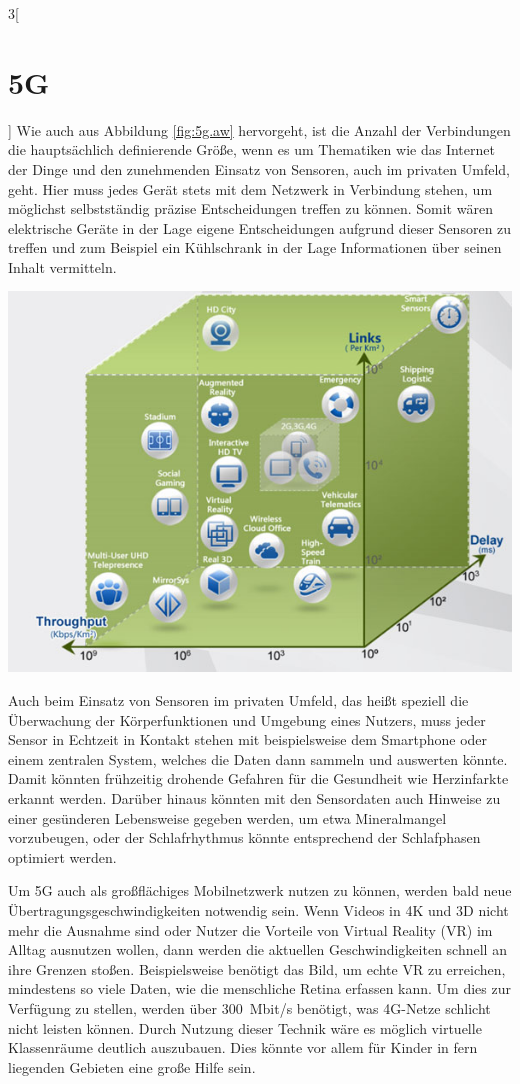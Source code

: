 \begin{multicols}{3}[\section{5G}]
Wie auch aus Abbildung \ref{fig:5g.aw} hervorgeht, ist die Anzahl der Verbindungen die hauptsächlich definierende Größe, wenn es um Thematiken wie das Internet der Dinge und den zunehmenden Einsatz von Sensoren, auch im privaten Umfeld, geht.
Hier muss jedes Gerät stets mit dem Netzwerk in Verbindung stehen, um möglichst selbstständig präzise Entscheidungen treffen zu können. Somit wären elektrische Geräte in der Lage eigene Entscheidungen aufgrund dieser Sensoren zu treffen und zum Beispiel ein Kühlschrank in der Lage Informationen über seinen Inhalt vermitteln.

\begin{Figure}
\includegraphics[width=\linewidth]{Kapitel/5G/Grafiken/5g-anwendung}
\label{fig:5g.aw}
\end{Figure}

Auch beim Einsatz von Sensoren im privaten Umfeld, das heißt speziell die Überwachung der Körperfunktionen und Umgebung eines Nutzers, muss jeder Sensor in Echtzeit in Kontakt stehen mit beispielsweise dem Smartphone oder einem zentralen System, welches die Daten dann sammeln und auswerten könnte. Damit könnten frühzeitig drohende Gefahren für die Gesundheit wie Herzinfarkte erkannt werden. Darüber hinaus könnten mit den Sensordaten auch Hinweise zu einer gesünderen Lebensweise gegeben werden, um etwa Mineralmangel vorzubeugen, oder der Schlafrhythmus könnte entsprechend der Schlafphasen optimiert werden.

Um 5G auch als großflächiges Mobilnetzwerk nutzen zu können, werden bald neue Übertragungsgeschwindigkeiten notwendig sein. Wenn Videos in 4K und 3D nicht mehr die Ausnahme sind oder Nutzer die Vorteile von Virtual Reality (VR) im Alltag ausnutzen wollen, dann werden die aktuellen Geschwindigkeiten schnell an ihre Grenzen stoßen.
Beispielsweise benötigt das Bild, um echte VR zu erreichen, mindestens so viele Daten, wie die menschliche Retina erfassen kann. Um dies zur Verfügung zu stellen, werden über \SI{300}{\mega bit/\second} benötigt, was 4G-Netze schlicht nicht leisten können.
Durch Nutzung dieser Technik wäre es möglich virtuelle Klassenräume deutlich auszubauen. Dies könnte vor allem für Kinder in fern liegenden Gebieten eine große Hilfe sein.


\end{multicols}
